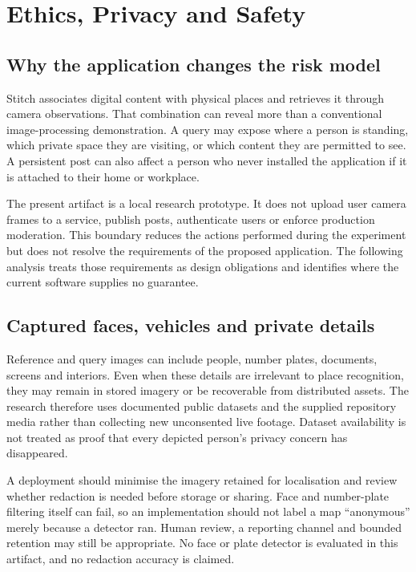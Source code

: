 \chapter{Ethics, Privacy and Safety}\label{ch:ethics}
\section{Why the application changes the risk model}
Stitch associates digital content with physical places and retrieves it through camera observations. That combination can reveal more than a conventional image-processing demonstration. A query may expose where a person is standing, which private space they are visiting, or which content they are permitted to see. A persistent post can also affect a person who never installed the application if it is attached to their home or workplace.

The present artifact is a local research prototype. It does not upload user camera frames to a service, publish posts, authenticate users or enforce production moderation. This boundary reduces the actions performed during the experiment but does not resolve the requirements of the proposed application. The following analysis treats those requirements as design obligations and identifies where the current software supplies no guarantee.

\section{Captured faces, vehicles and private details}
Reference and query images can include people, number plates, documents, screens and interiors. Even when these details are irrelevant to place recognition, they may remain in stored imagery or be recoverable from distributed assets. The research therefore uses documented public datasets and the supplied repository media rather than collecting new unconsented live footage. Dataset availability is not treated as proof that every depicted person's privacy concern has disappeared.

A deployment should minimise the imagery retained for localisation and review whether redaction is needed before storage or sharing. Face and number-plate filtering itself can fail, so an implementation should not label a map ``anonymous'' merely because a detector ran. Human review, a reporting channel and bounded retention may still be appropriate. No face or plate detector is evaluated in this artifact, and no redaction accuracy is claimed.

